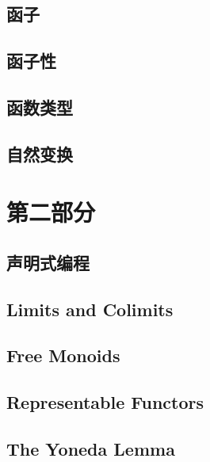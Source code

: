 \chapter{函子}\label{functors}


\chapter{函子性}\label{functoriality}


\chapter{函数类型}\label{function-types}


\chapter{自然变换}\label{natural-transformations}


\part*{第二部分}

\chapter{声明式编程}\label{declarative-programming}


\chapter{Limits and Colimits}\label{limits-and-colimits}


\chapter{Free Monoids}\label{free-monoids}


\chapter{Representable Functors}\label{representable-functors}


\chapter{The Yoneda Lemma}\label{the-yoneda-lemma}



